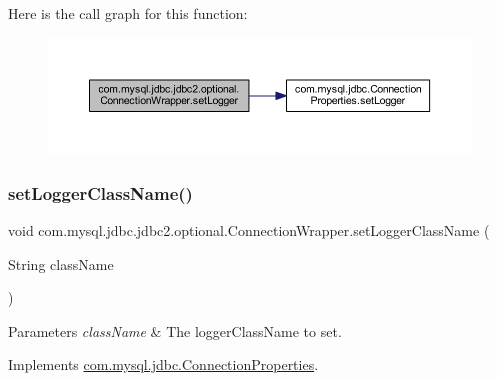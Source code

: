 Here is the call graph for this function\+:
\nopagebreak
\begin{figure}[H]
\begin{center}
\leavevmode
\includegraphics[width=350pt]{classcom_1_1mysql_1_1jdbc_1_1jdbc2_1_1optional_1_1_connection_wrapper_ab982b5f1ecb96624a273f3a120971b09_cgraph}
\end{center}
\end{figure}
\mbox{\label{classcom_1_1mysql_1_1jdbc_1_1jdbc2_1_1optional_1_1_connection_wrapper_a83bbb6fcf7e7526415776d20aff135fd}} 
\subsubsection{\texorpdfstring{set\+Logger\+Class\+Name()}{setLoggerClassName()}}
{\footnotesize\ttfamily void com.\+mysql.\+jdbc.\+jdbc2.\+optional.\+Connection\+Wrapper.\+set\+Logger\+Class\+Name (\begin{DoxyParamCaption}\item[{String}]{class\+Name }\end{DoxyParamCaption})}


\begin{DoxyParams}{Parameters}
{\em class\+Name} & The logger\+Class\+Name to set. \\
\hline
\end{DoxyParams}


Implements \mbox{\hyperlink{interfacecom_1_1mysql_1_1jdbc_1_1_connection_properties_a4bde3c5c986dba54cf5ed53038cb7181}{com.\+mysql.\+jdbc.\+Connection\+Properties}}.

